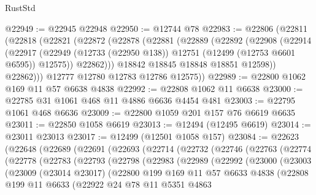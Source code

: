 \begin{lexlean}{RustStd}
\begin{coremodule}
{\begin{coremodule}
{{{{{{{{{{{{{{{{{{{{{{{{{{{{{{{{{{{{{{{{{{{{{{{{{{{{{{{{{{{{{{{{{{{{{{{{{{{{{{{{@22949 := @22945 @22948
@22950 := @12744 @78
@22983 := @22806
    (@22811
      (@22818
        (@22821
          (@22872
            (@22878
              (@22881
                (@22889
                  (@22892
                    (@22908
                      (@22914
                        (@22917
                          (@22949
                            (@12733 (@22950 @138))
                            @12751
                            (@12499 (@12753 @6601 @6595))
                            @12575))
                        @22862)))
                  @18842
                  @18845
                  @18848
                  @18851
                  @12598))
              @22862)))
        @12777
        @12780
        @12783
        @12786
        @12575))
@22989 := @22800 @1062 @169 @11 @57 @6638 @4838
@22992 := @22808 @1062 @11 @6638
@23000 := @22785 @31 @1061 @468 @11 @4886 @6636 @4454 @481
@23003 := @22795 @1061 @468 @6636
@23009 := @22800 @1059 @201 @157 @76 @6619 @6635
@23011 := @22850 @1058 @6619
@23013 := @12494 (@12495 @6619)
@23014 := @23011 @23013
@23017 := @12499 (@12501 @1058 @157)
@23084 := @22623
    (@22648
      (@22689
        (@22691
          (@22693
            (@22714
              (@22732
                (@22746
                  (@22763
                    (@22774
                      (@22778
                        (@22783
                          (@22793
                            (@22798
                              (@22983
                                (@22989
                                  (@22992
                                    (@23000
                                      (@23003
                                        (@23009
                                          (@23014 @23017)
                                          (@22800
                                            @199
                                            @169
                                            @11
                                            @57
                                            @6633
                                            @4838
                                            (@22808
                                              @199
                                              @11
                                              @6633
                                              (@22922
                                                @24
                                                @78
                                                @11
                                                @5351
                                                @4863
}}}}}}}}}}}}}}}}}}}}}}}}}}}}}}}}}}}}}}}}}}}}}}}}}}}}}}}}}}}}}}}}}}}}}}}}}}}}}}}}
\end{coremodule}}
\end{coremodule}
\end{lexlean}
